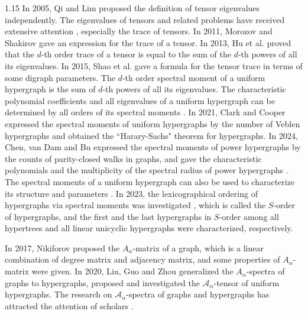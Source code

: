\documentclass[preprint,12pt]{elsarticle1}
\numberwithin{equation}{section}
\begin{document}
\begin{spacing}{1.15}
In 2005, Qi \cite{ref2} and Lim \cite{ref1} proposed the definition of tensor eigenvalues independently.
The eigenvalues of tensors and related problems have received extensive attention \cite{WOS:000346407800007,Fan2019AMS,changanSIAM2022,LHH2024,Nikiforov2017,MP}, especially the trace of tensors.
In 2011, Morozov and Shakirov \cite{ref6} gave an expression for the trace of a tensor.
In 2013, Hu et al. \cite{ref7} proved that the $d$-th order trace of a tensor is equal to the sum of the $d$-th powers of all its eigenvalues.
In 2015, Shao et al. \cite{ref8} gave a formula for the tensor trace in terms of some digraph parameters.
The $d$-th order spectral moment of a uniform hypergraph is the sum of $d$-th powers of all its eigenvalues.
The characteristic polynomial coefficients and all eigenvalues of a uniform hypergraph can be determined by all orders of its spectral moments \cite{ref11,ref23,ref10,Duan2023doublestar}.
In 2021, Clark and Cooper \cite{ref10} expressed the spectral moments of uniform hypergraphs by the number of Veblen hypergraphs and obtained the ``Harary-Sachs" theorem for hypergraphs.
In 2024, Chen, van Dam and Bu \cite{ref23} expressed the spectral moments of power hypergraphs by the counts of parity-closed walks in graphs, and gave the characteristic polynomials and the multiplicity of the spectral radius of power hypergraphs \cite{ref23}.
The spectral moments of a uniform hypergraph can also be used to characterize its structure \cite{ref16,ref31} and parameters \cite{ref35,ref22}.
In 2023, the lexicographical ordering of hypergraphs via spectral moments was investigated \cite{sorder}, which is called the $S$-order of hypergraphs, and the first and the last hypergraphs in $S$-order among all hypertrees and all linear unicyclic hypergraphs were characterized, respectively.

In 2017, Nikiforov \cite{alphaofgraph} proposed the $A_{\alpha}$-matrix of a graph, which is a linear combination of degree matrix and adjacency matrix, and some properties of $A_{\alpha}$-matrix were given.
In 2020, Lin, Guo and Zhou \cite{alphaofhypergraph} generalized the $A_{\alpha}$-spectra of graphs to hypergraphs, proposed and investigated the $\mathcal{A}_{\alpha}$-tensor of uniform hypergraphs.
The research on $\mathcal{A}_{\alpha}$-spectra of graphs and hypergraphs has attracted the attention of scholars \cite{WOS:000547249300008,WOS:000443667300012,WOS:000864637600006,WOS:001490552500001,WOS:000699906300018}.


\end{spacing}
\end{document}
